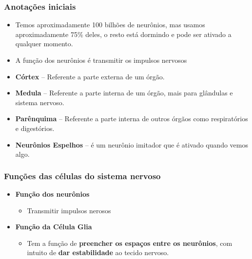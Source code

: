 \documentclass[
]{book}
\providecommand{\tightlist}{%
  \setlength{\itemsep}{0pt}\setlength{\parskip}{0pt}}
\begin{document}
\hypertarget{anotauxe7uxf5es-iniciais}{%
\subsubsection{Anotações iniciais}\label{anotauxe7uxf5es-iniciais}}

\begin{itemize}
\tightlist
\item
  Temos aproximadamente 100 bilhões de neurônios, mas usamos aproximadamente 75\% deles, o resto está dormindo e pode ser ativado a qualquer momento.
\item
  A função dos neurônios é transmitir os impulsos nervosos\\
\item
  \textbf{Córtex} -- Referente a parte externa de um órgão.
\item
  \textbf{Medula} -- Referente a parte interna de um órgão, mais para glândulas e sistema nervoso.
\item
  \textbf{Parênquima} -- Referente a parte interna de outros órgãos como respiratórios e digestórios.
\item
  \textbf{Neurônios Espelhos} -- é um neurônio imitador que é ativado quando vemos algo.
\end{itemize}

\hypertarget{funuxe7uxf5es-das-cuxe9lulas-do-sistema-nervoso}{%
\subsubsection{Funções das células do sistema nervoso}\label{funuxe7uxf5es-das-cuxe9lulas-do-sistema-nervoso}}

\begin{itemize}
\tightlist
\item
  \textbf{Função dos neurônios}

  \begin{itemize}
  \tightlist
  \item
    Transmitir impulsos nerosos
  \end{itemize}
\item
  \textbf{Função da Célula Glia}

  \begin{itemize}
  \tightlist
  \item
    Tem a função de \textbf{preencher os espaços entre os neurônios}, com intuito de \textbf{dar estabilidade} ao tecido nervoso.
  \end{itemize}
\end{itemize}
\end{document}
